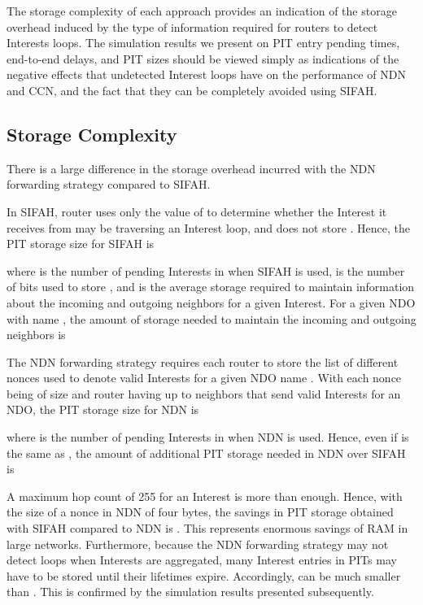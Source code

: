 \documentclass{ancs15-alternate}
\begin{document}
The storage complexity of each approach provides an indication of the storage overhead induced by the type of information required for routers to detect Interests loops. The simulation results we present on  PIT entry pending times, end-to-end delays, and PIT sizes 
should be viewed simply as indications of the negative effects that undetected Interest loops have on the performance of NDN and CCN, and the fact that they can be completely avoided using SIFAH. 


\subsection{Storage Complexity}

There is a large difference in the storage overhead incurred with 
the NDN  forwarding strategy compared to SIFAH.

In SIFAH, router  uses only the value of  to determine whether the Interest it receives from  may be traversing an Interest loop, and does not store . Hence, the PIT storage size 
for SIFAH is  

\noindent
where  is the number of pending Interests in  when SIFAH is used,   is the number of bits used to store , and
 is the average storage required to maintain information about the incoming and outgoing neighbors for a given Interest.
For a given NDO with name , the amount of storage needed to maintain the incoming and outgoing neighbors is 


The NDN  forwarding strategy requires each router to store the list of different  nonces used to denote valid Interests for a given NDO name . With each nonce being of size  and router  having up to  neighbors that send valid Interests for an NDO, the 
PIT storage size for NDN is 

\noindent
 where  is the number of pending Interests in  when NDN is used. 
Hence, even if  is the same as , 
the amount of additional PIT storage needed in NDN over SIFAH is 


A   maximum hop count  of 255 for an Interest
is more than enough. Hence,  with the  size of  a nonce  in NDN of four bytes, the savings in PIT storage obtained with SIFAH  compared to NDN  is
. This  represents enormous savings   of RAM in large networks.
Furthermore, because the NDN forwarding strategy may not detect loops when Interests are aggregated,  many Interest entries in PITs 
may have to be stored until their lifetimes expire. Accordingly, 
 can be much smaller than . This is confirmed by the simulation results presented subsequently.
\end{document}
